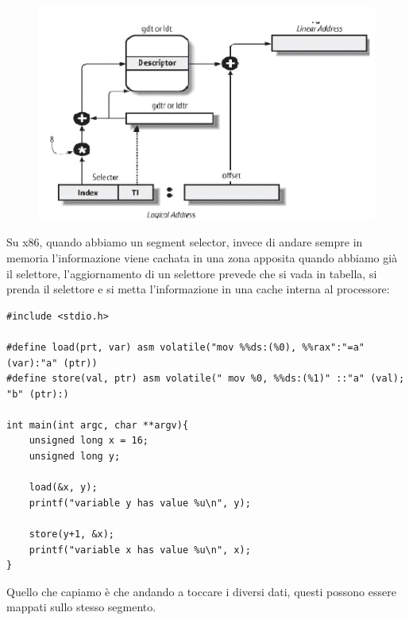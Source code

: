 \documentclass[12pt, oneside]{extbook}
\begin{document}
\begin{figure}[!h]
	\includegraphics[scale=0.5]{immagini/accesso_gdt.png}
\end{figure}
Su x86, quando abbiamo un segment selector, invece di andare sempre in memoria l'informazione viene cachata in una zona apposita quando abbiamo già il selettore, l'aggiornamento di un selettore prevede che si vada in tabella, si prenda il selettore e si metta l'informazione in una cache interna al processore:
\begin{lstlisting}
#include <stdio.h>

#define load(prt, var) asm volatile("mov %%ds:(%0), %%rax":"=a"  (var):"a" (ptr))
#define store(val, ptr) asm volatile(" mov %0, %%ds:(%1)" ::"a" (val);
"b" (ptr):)

int main(int argc, char **argv){
	unsigned long x = 16;
	unsigned long y;
	
	load(&x, y);
	printf("variable y has value %u\n", y);
	
	store(y+1, &x);
	printf("variable x has value %u\n", x);
}

\end{lstlisting}
Quello che capiamo è che andando a toccare i diversi dati, questi possono essere mappati sullo stesso segmento.
\end{document}
